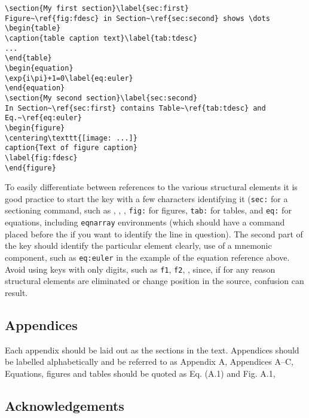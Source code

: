 \documentclass{cernrep}
\begin{document}
\begin{verbatim}
\section{My first section}\label{sec:first}
Figure~\ref{fig:fdesc} in Section~\ref{sec:second} shows \dots
\begin{table}
\caption{table caption text}\label{tab:tdesc}
...
\end{table}
\begin{equation}
\exp{i\pi}+1=0\label{eq:euler}
\end{equation}
\section{My second section}\label{sec:second}
In Section~\ref{sec:first} contains Table~\ref{tab:tdesc} and
Eq.~\ref{eq:euler}
\begin{figure}
\centering\texttt{[image: ...]}
caption{Text of figure caption}
\label{fig:fdesc}
\end{figure}
\end{verbatim}
To easily differentiate between references to the various structural
elements it is good practice to start the key with a few characters
identifying it (\eg \texttt{sec:} for a sectioning command, such as
, , \etc, \texttt{fig:} for figures,
\texttt{tab:} for tables, and \texttt{eq:} for equations, including
\texttt{eqnarray} environments (which should have a 
command placed before the \Lcs{\bs} if you want to identify the line
in question). The second part of the key should identify the
particular element clearly, \eg use of a mnemonic component, such as
\texttt{eq:euler} in the example of the equation reference
above. Avoid using keys with only digits, such as \texttt{f1},
\texttt{f2}, \etc, since, if for any reason structural elements are
eliminated or change position in the source, confusion can result.

\subsection{Appendices}

Each appendix should be laid out as the sections in the text.
Appendices should be labelled alphabetically and be referred to as
Appendix A, Appendices A--C, \etc Equations, figures and tables should
be quoted as Eq. (A.1) and Fig. A.1, \etc

\subsection{Acknowledgements}
\end{document}
